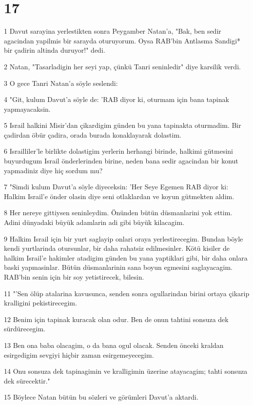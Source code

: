 \chapter{17}

\par 1 Davut sarayina yerlestikten sonra Peygamber Natan'a, "Bak, ben sedir agacindan yapilmis bir sarayda oturuyorum. Oysa RAB'bin Antlasma Sandigi* bir çadirin altinda duruyor!" dedi.
\par 2 Natan, "Tasarladigin her seyi yap, çünkü Tanri seninledir" diye karsilik verdi.
\par 3 O gece Tanri Natan'a söyle seslendi:
\par 4 "Git, kulum Davut'a söyle de: 'RAB diyor ki, oturmam için bana tapinak yapmayacaksin.
\par 5 Israil halkini Misir'dan çikardigim günden bu yana tapinakta oturmadim. Bir çadirdan öbür çadira, orada burada konaklayarak dolastim.
\par 6 Israilliler'le birlikte dolastigim yerlerin herhangi birinde, halkimi gütmesini buyurdugum Israil önderlerinden birine, neden bana sedir agacindan bir konut yapmadiniz diye hiç sordum mu?
\par 7 "Simdi kulum Davut'a söyle diyeceksin: 'Her Seye Egemen RAB diyor ki: Halkim Israil'e önder olasin diye seni otlaklardan ve koyun gütmekten aldim.
\par 8 Her nereye gittiysen seninleydim. Önünden bütün düsmanlarini yok ettim. Adini dünyadaki büyük adamlarin adi gibi büyük kilacagim.
\par 9 Halkim Israil için bir yurt saglayip onlari oraya yerlestirecegim. Bundan böyle kendi yurtlarinda otursunlar, bir daha rahatsiz edilmesinler. Kötü kisiler de halkim Israil'e hakimler atadigim günden bu yana yaptiklari gibi, bir daha onlara baski yapmasinlar. Bütün düsmanlarinin sana boyun egmesini saglayacagim. RAB'bin senin için bir soy yetistirecek, bilesin.
\par 11 "'Sen ölüp atalarina kavusunca, senden sonra ogullarindan birini ortaya çikarip kralligini pekistirecegim.
\par 12 Benim için tapinak kuracak olan odur. Ben de onun tahtini sonsuza dek sürdürecegim.
\par 13 Ben ona baba olacagim, o da bana ogul olacak. Senden önceki kraldan esirgedigim sevgiyi hiçbir zaman esirgemeyecegim.
\par 14 Onu sonsuza dek tapinagimin ve kralligimin üzerine atayacagim; tahti sonsuza dek sürecektir."
\par 15 Böylece Natan bütün bu sözleri ve görümleri Davut'a aktardi.
